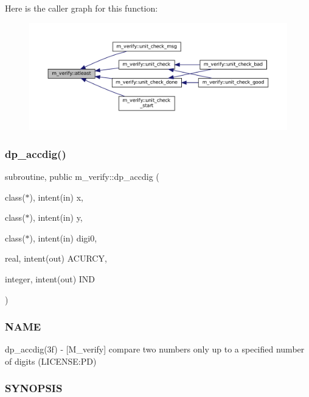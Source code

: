 Here is the caller graph for this function\+:\nopagebreak
\begin{figure}[H]
\begin{center}
\leavevmode
\includegraphics[width=350pt]{namespacem__verify_a6185c00609b8f0e4c5a503cfadcb2490_icgraph}
\end{center}
\end{figure}
\mbox{\label{namespacem__verify_a7408df33e6934a8959fdeda8cc3fb5ff}} 
\subsubsection{\texorpdfstring{dp\+\_\+accdig()}{dp\_accdig()}}
{\footnotesize\ttfamily subroutine, public m\+\_\+verify\+::dp\+\_\+accdig (\begin{DoxyParamCaption}\item[{class($\ast$), intent(in)}]{x,  }\item[{class($\ast$), intent(in)}]{y,  }\item[{class($\ast$), intent(in)}]{digi0,  }\item[{real, intent(out)}]{A\+C\+U\+R\+CY,  }\item[{integer, intent(out)}]{I\+ND }\end{DoxyParamCaption})}



\subsubsection*{N\+A\+ME}

dp\+\_\+accdig(3f) -\/ \mbox{[}M\+\_\+verify\mbox{]} compare two numbers only up to a specified number of digits (L\+I\+C\+E\+N\+SE\+:PD) 

\subsubsection*{S\+Y\+N\+O\+P\+S\+IS}

